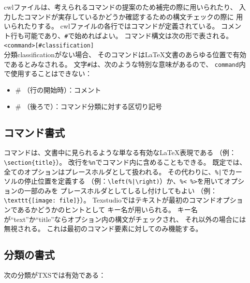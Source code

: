 cwlファイルは、考えられるコマンドの提案のため補完の際に用いられたり、
入力したコマンドが実存しているかどうか確認するための構文チェックの際に
用いられたりする。
cwlファイルの各行ではコマンドが定義されている。
コメント行も可能であり、\verb+#+で始めればよい。
コマンド構文は次の形で表される。\\

\verb+<command>[#classification]+\\

分類classificationがない場合、
そのコマンドはLaTeX文書のあらゆる位置で有効であるとみなされる。
文字\verb+#+は、次のような特別な意味があるので、
\verb+command+内で使用することはできない：

\begin{itemize}
\item
  \# （行の開始時）：コメント
\item
  \# （後ろで）：コマンド分類に対する区切り記号
\end{itemize}

\subsection{コマンド書式}

コマンドは、文書中に見られるような単なる有効なLaTeX表現である
（例：\verb+\section{title}+）。
改行を\verb+%n+でコマンド内に含めることもできる。
既定では、全てのオプションはプレースホルダとして扱われる。
その代わりに、\verb+%|+でカーソルの停止位置を定義する
（例：\verb+\left(%|\right)+）か、\verb+%< %>+を用いてオプションの一部のみを
プレースホルダとしてしるし付けしてもよい
（例：\verb+\texttt{[image: file]}+）。
Texstudioではテキストが最初のコマンドオプションであるかどうかのヒントとして
キー名が用いられる。
キー名が``text''か``title''ならオプション内の構文がチェックされ、
それ以外の場合には無視される。
これは最初のコマンド要素に対してのみ機能する。

\subsection{分類の書式}

次の分類がTXSでは有効である：

